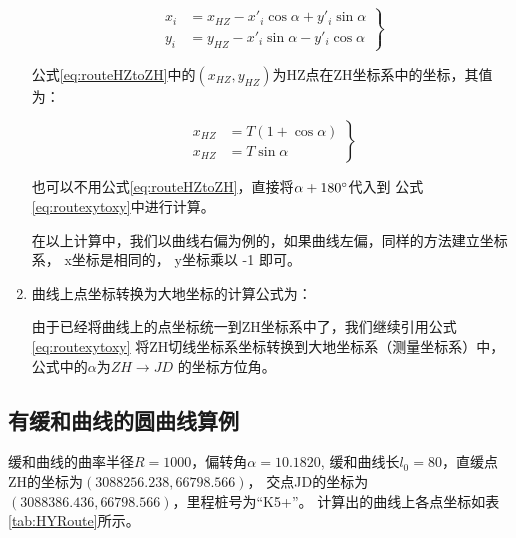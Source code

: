 \begin{enumerate}
\begin{equation}
\left . \begin{aligned}
x_i &= x_{HZ} - x'_i  \cos \alpha + y'_i \sin \alpha \\
y_i &= y_{HZ}  -  x'_i \sin \alpha -  y'_i \cos \alpha 
\end{aligned} \right \}
\label{eq:routeHZtoZH}
\end{equation}

公式\ref{eq:routeHZtoZH}中的$(x_{HZ}, y_{HZ})$为HZ点在ZH坐标系中的坐标，其值为：

\begin{equation}
\left . \begin{aligned}
x_{HZ} &= T (1 +  \cos \alpha) \\
x_{HZ} &=  T \sin \alpha 
\end{aligned} \right \}
\label{eq:routeHZXY}
\end{equation}

也可以不用公式\ref{eq:routeHZtoZH}，直接将$\alpha+180^\circ$代入到
公式\ref{eq:routexytoxy}中进行计算。

在以上计算中，我们以曲线右偏为例的，如果曲线左偏，同样的方法建立坐标系，
x坐标是相同的， y坐标乘以 -1 即可。

\item 曲线上点坐标转换为大地坐标的计算公式为：

由于已经将曲线上的点坐标统一到ZH坐标系中了，我们继续引用公式\ref{eq:routexytoxy}
将ZH切线坐标系坐标转换到大地坐标系（测量坐标系）中，公式中的$\alpha$为$ZH \rightarrow JD$
的坐标方位角。

\end{enumerate}


\subsection{有缓和曲线的圆曲线算例}

缓和曲线的曲率半径$R=1000$，偏转角$\alpha =10.1820$,
缓和曲线长$l_0=80$，直缓点ZH的坐标为$(3088256.238, 66798.566)$，
交点JD的坐标为$(3088386.436, 66798.566)$，里程桩号为``K5+''。
计算出的曲线上各点坐标如表\ref{tab:HYRoute}所示。

